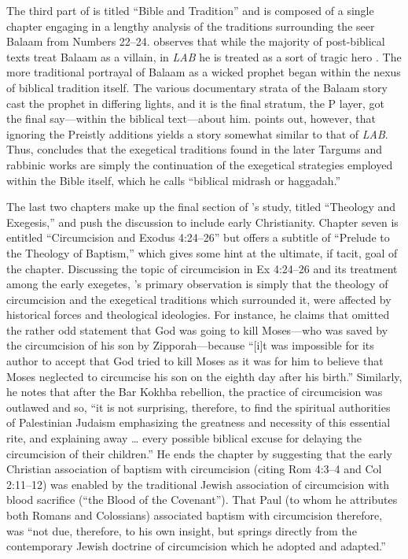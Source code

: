  The third part of  is titled ``Bible and Tradition'' and is composed of a single chapter engaging in a lengthy analysis of the traditions surrounding the seer Balaam from Numbers 22--24. \vermes observes that while the majority of post-biblical texts treat Balaam as a villain, in \emph{LAB} he is treated as a sort of tragic hero \autocite[173]{vermes1961}. The more traditional portrayal of Balaam as a wicked prophet began within the nexus of biblical tradition itself. The various documentary strata of the Balaam story cast the prophet in differing lights, and it is the final stratum, the P layer, got the final say---within the biblical text---about him. \vermes points out, however, that ignoring the Preistly additions yields a story somewhat similar to that of \emph{LAB}. Thus, \vermes concludes that the exegetical traditions found in the later Targums and rabbinic works are simply the continuation of the exegetical strategies employed within the Bible itself, which he calls ``biblical midrash or haggadah.'' \autocite[176]{vermes1961}

 The last two chapters make up the final section of \vermes's study, titled ``Theology and Exegesis,'' and push the discussion to include early Christianity. Chapter seven is entitled ``Circumcision and Exodus 4:24--26'' but offers a subtitle of ``Prelude to the Theology of Baptism,'' which gives some hint at the ultimate, if tacit, goal of the chapter. Discussing the topic of circumcision in Ex 4:24--26 and its treatment among the early exegetes, \vermes's primary observation is simply that the theology of circumcision and the exegetical traditions which surrounded it, were affected by historical forces and theological ideologies. For instance, he claims that \jub omitted the rather odd statement that God was going to kill Moses---who was saved by the circumcision of his son by Zipporah---because ``[i]t was impossible for its author to accept that God tried to kill Moses as it was for him to believe that Moses neglected to circumcise his son on the eighth day after his birth.''\autocite[185]{vermes1961} Similarly, he notes that after the Bar Kokhba rebellion, the practice of circumcision was outlawed and so, ``it is not surprising, therefore, to find the spiritual authorities of Palestinian Judaism emphasizing the greatness and necessity of this essential rite, and explaining away \ldots{} every possible biblical excuse for delaying the circumcision of their children.''\autocite[189]{vermes1961} He ends the chapter by suggesting that the early Christian association of baptism with circumcision (citing Rom 4:3--4 and Col 2:11--12) was enabled by the traditional Jewish association of circumcision with blood sacrifice (``the Blood of the Covenant'')\autocite[190]{vermes1961}. That Paul (to whom he attributes both Romans and Colossians) associated baptism with circumcision therefore, was ``not due, therefore, to his own insight, but springs directly from the contemporary Jewish doctrine of circumcision which he adopted and adapted.''\autocite[191]{vermes1961} 

